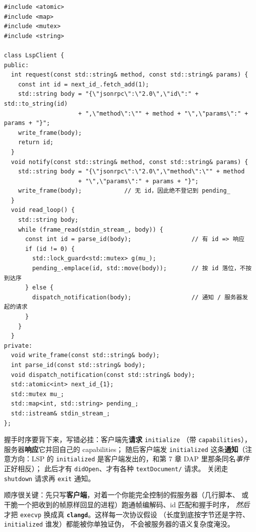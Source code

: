 \documentclass[12pt,a4paper,fontset=fandol]{ctexbook}
\newcommand{\Lib}[1]{\textbf{\texttt{#1}}}
\newcommand{\CD}{\Lib{clangd}}
\begin{document}
\begin{lstlisting}[style=cppstyle,caption={请求分配自增 id、写帧；通知不入队；读循环另起线程},label={lst:ch08-loop}]
#include <atomic>
#include <map>
#include <mutex>
#include <string>

class LspClient {
public:
  int request(const std::string& method, const std::string& params) {
    const int id = next_id_.fetch_add(1);
    std::string body = "{\"jsonrpc\":\"2.0\",\"id\":" + std::to_string(id)
                     + ",\"method\":\"" + method + "\",\"params\":" + params + "}";
    write_frame(body);
    return id;
  }
  void notify(const std::string& method, const std::string& params) {
    std::string body = "{\"jsonrpc\":\"2.0\",\"method\":\"" + method
                     + "\",\"params\":" + params + "}";
    write_frame(body);            // 无 id，因此绝不登记到 pending_
  }
  void read_loop() {
    std::string body;
    while (frame_read(stdin_stream_, body)) {
      const int id = parse_id(body);                 // 有 id => 响应
      if (id != 0) {
        std::lock_guard<std::mutex> g(mu_);
        pending_.emplace(id, std::move(body));       // 按 id 落位，不按到达序
      } else {
        dispatch_notification(body);                 // 通知 / 服务器发起的请求
      }
    }
  }
private:
  void write_frame(const std::string& body);
  int parse_id(const std::string& body);
  void dispatch_notification(const std::string& body);
  std::atomic<int> next_id_{1};
  std::mutex mu_;
  std::map<int, std::string> pending_;
  std::istream& stdin_stream_;
};
\end{lstlisting}

握手时序要背下来，写错必挂：客户端先\textbf{请求} \texttt{initialize}
（带 \texttt{capabilities}），服务器\textbf{响应}它并回自己的 capabilities；
随后客户端发 \texttt{initialized} 这条\textbf{通知}（注意方向：LSP 的
\texttt{initialized} 是客户端发出的，和第 7 章 DAP 里那条同名\emph{事件}正好相反）；
此后才有 \texttt{didOpen}、才有各种 \texttt{textDocument/} 请求。
关闭走 \texttt{shutdown} 请求再 \texttt{exit} 通知。

\begin{guideline}[title={先写客户端，再接真服务器}]
顺序很关键：先只写\textbf{客户端}，对着一个你能完全控制的假服务器（几行脚本、
或干脆一个把收到的帧原样回显的进程）跑通帧编解码、id 匹配和握手时序，
\emph{然后}才把 \texttt{execvp} 换成真 \CD。这样每一次协议假设
（长度到底按字节还是字符、\texttt{initialized} 谁发）都能被你单独证伪，
不会被服务器的语义复杂度淹没。
\end{guideline}
\end{document}
